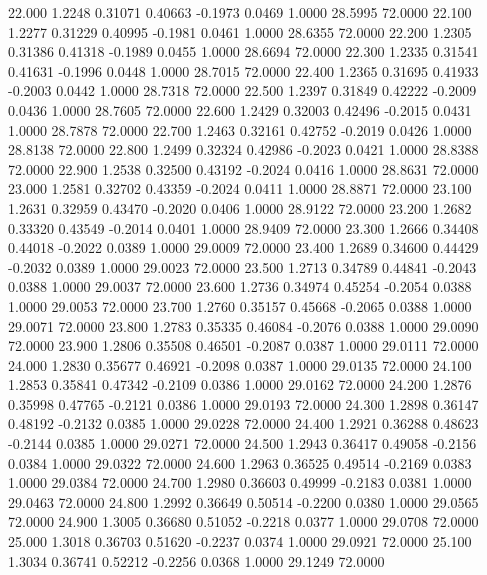   22.000   1.2248   0.31071   0.40663  -0.1973   0.0469   1.0000  28.5995  72.0000
  22.100   1.2277   0.31229   0.40995  -0.1981   0.0461   1.0000  28.6355  72.0000
  22.200   1.2305   0.31386   0.41318  -0.1989   0.0455   1.0000  28.6694  72.0000
  22.300   1.2335   0.31541   0.41631  -0.1996   0.0448   1.0000  28.7015  72.0000
  22.400   1.2365   0.31695   0.41933  -0.2003   0.0442   1.0000  28.7318  72.0000
  22.500   1.2397   0.31849   0.42222  -0.2009   0.0436   1.0000  28.7605  72.0000
  22.600   1.2429   0.32003   0.42496  -0.2015   0.0431   1.0000  28.7878  72.0000
  22.700   1.2463   0.32161   0.42752  -0.2019   0.0426   1.0000  28.8138  72.0000
  22.800   1.2499   0.32324   0.42986  -0.2023   0.0421   1.0000  28.8388  72.0000
  22.900   1.2538   0.32500   0.43192  -0.2024   0.0416   1.0000  28.8631  72.0000
  23.000   1.2581   0.32702   0.43359  -0.2024   0.0411   1.0000  28.8871  72.0000
  23.100   1.2631   0.32959   0.43470  -0.2020   0.0406   1.0000  28.9122  72.0000
  23.200   1.2682   0.33320   0.43549  -0.2014   0.0401   1.0000  28.9409  72.0000
  23.300   1.2666   0.34408   0.44018  -0.2022   0.0389   1.0000  29.0009  72.0000
  23.400   1.2689   0.34600   0.44429  -0.2032   0.0389   1.0000  29.0023  72.0000
  23.500   1.2713   0.34789   0.44841  -0.2043   0.0388   1.0000  29.0037  72.0000
  23.600   1.2736   0.34974   0.45254  -0.2054   0.0388   1.0000  29.0053  72.0000
  23.700   1.2760   0.35157   0.45668  -0.2065   0.0388   1.0000  29.0071  72.0000
  23.800   1.2783   0.35335   0.46084  -0.2076   0.0388   1.0000  29.0090  72.0000
  23.900   1.2806   0.35508   0.46501  -0.2087   0.0387   1.0000  29.0111  72.0000
  24.000   1.2830   0.35677   0.46921  -0.2098   0.0387   1.0000  29.0135  72.0000
  24.100   1.2853   0.35841   0.47342  -0.2109   0.0386   1.0000  29.0162  72.0000
  24.200   1.2876   0.35998   0.47765  -0.2121   0.0386   1.0000  29.0193  72.0000
  24.300   1.2898   0.36147   0.48192  -0.2132   0.0385   1.0000  29.0228  72.0000
  24.400   1.2921   0.36288   0.48623  -0.2144   0.0385   1.0000  29.0271  72.0000
  24.500   1.2943   0.36417   0.49058  -0.2156   0.0384   1.0000  29.0322  72.0000
  24.600   1.2963   0.36525   0.49514  -0.2169   0.0383   1.0000  29.0384  72.0000
  24.700   1.2980   0.36603   0.49999  -0.2183   0.0381   1.0000  29.0463  72.0000
  24.800   1.2992   0.36649   0.50514  -0.2200   0.0380   1.0000  29.0565  72.0000
  24.900   1.3005   0.36680   0.51052  -0.2218   0.0377   1.0000  29.0708  72.0000
  25.000   1.3018   0.36703   0.51620  -0.2237   0.0374   1.0000  29.0921  72.0000
  25.100   1.3034   0.36741   0.52212  -0.2256   0.0368   1.0000  29.1249  72.0000

